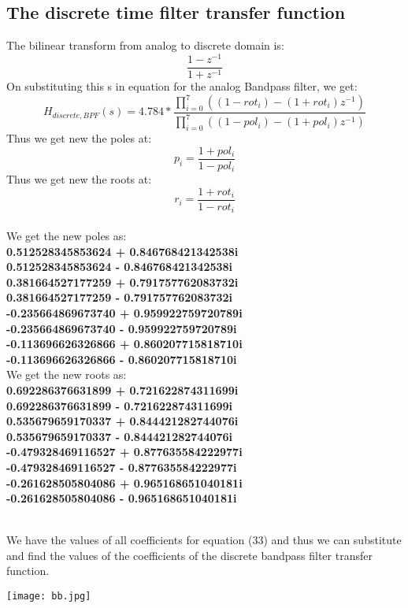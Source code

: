\documentclass[12pt]{article}
\begin{document}
\subsection{The discrete time filter transfer function}
The bilinear transform from analog to discrete domain is:
\begin{equation}
    \frac{1-z^{-1}}{1+z^{-1}}
\end{equation}
On substituting this s in equation for the analog Bandpass filter, we get:
\begin{equation}
    H_{discrete,BPF}(s)=4.784*\frac{\prod_{i=0}^{7}((1-rot_i)-(1+rot_i)z^{-1})}{\prod_{i=0}^{7}((1-pol_i)-(1+pol_i)z^{-1})} 
\end{equation}
Thus we get new the poles at:
\begin{equation}
    p_i=\frac{1+pol_i}{1-pol_i}
\end{equation}
Thus we get new the roots at:
\begin{equation}
    r_i=\frac{1+rot_i}{1-rot_i}
\end{equation}
\newpage
 \\We get the new poles as: \textbf{\\0.512528345853624 + 0.846768421342538i
\\0.512528345853624 - 0.846768421342538i
\\0.381664527177259 + 0.791757762083732i
\\0.381664527177259 - 0.791757762083732i
\\-0.235664869673740 + 0.959922759720789i
\\-0.235664869673740 - 0.959922759720789i
\\-0.113696626326866 + 0.860207715818710i
\\-0.113696626326866 - 0.860207715818710i}
\\We get the new roots as: \textbf{\\0.692286376631899 + 0.721622874311699i
\\0.692286376631899 - 0.721622874311699i
\\0.535679659170337 + 0.844421282744076i
\\0.535679659170337 - 0.844421282744076i
\\-0.479328469116527 + 0.877635584222977i
\\-0.479328469116527 - 0.877635584222977i
\\-0.261628505804086 + 0.965168651040181i
\\-0.261628505804086 - 0.965168651040181i}

\\We have the values of all coefficients for equation (33) and thus we can substitute and find the values of the coefficients of the discrete bandpass filter transfer function.
\begin{center}
\texttt{[image: bb.jpg]}
\end{center}
\end{document}
